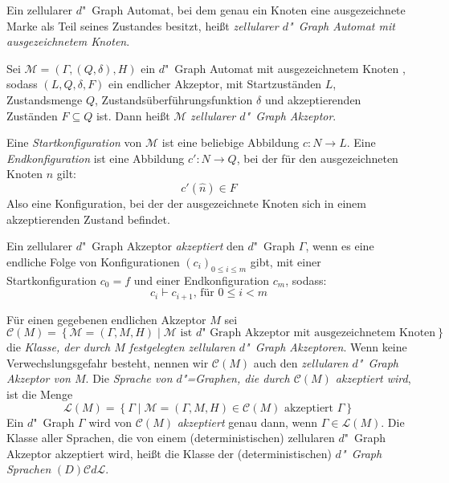 \documentclass[11pt]{article}
\newcommand{\defWord}[1]{\emph{#1}}
\begin{document}
\begin{definition}[Akzeptanz]
	Ein zellularer $d$"~Graph Automat, bei dem genau ein Knoten eine ausgezeichnete Marke als Teil seines Zustandes  besitzt, heißt \defWord{zellularer $d$"~Graph Automat mit ausgezeichnetem Knoten}.
	
	Sei $\mathcal{M} = \left(\Gamma, (Q, \delta), H \right)$ ein $d$"~Graph Automat mit ausgezeichnetem Knoten , sodass $(L, Q, \delta, F)$ ein endlicher Akzeptor, mit Startzuständen $L$, Zustandsmenge $Q$, Zustandsüberführungsfunktion $\delta$ und akzeptierenden Zuständen $F \subseteq Q$ ist. Dann heißt $\mathcal{M}$ \defWord{zellularer $d$"~Graph Akzeptor}.
	
	Eine \defWord{Startkonfiguration} von $\mathcal{M}$ ist eine beliebige Abbildung $c : N \rightarrow L$. 
	Eine \defWord{Endkonfiguration} ist eine Abbildung $c' : N \rightarrow Q$, bei der für den ausgezeichneten Knoten $\hat{n}$ gilt: 
	\begin{displaymath}
		c'(\hat{n}) \in F
	\end{displaymath} 
	Also eine Konfiguration, bei der der ausgezeichnete Knoten sich in einem akzeptierenden Zustand befindet.
	
	Ein zellularer $d$"~Graph Akzeptor \defWord{akzeptiert} den $d$"~Graph $\Gamma$, wenn es eine endliche Folge von Konfigurationen $\left(c_i\right)_{0 \le i \le m}$ gibt, mit einer Startkonfiguration $c_0 = f$ und einer Endkonfiguration $c_m$, sodass:
	\begin{displaymath}
		c_{i} \vdash c_{i+1} \text{, für } 0 \le i < m
	\end{displaymath}
\end{definition}

\begin{definition}[Sprachen]
	Für einen gegebenen endlichen Akzeptor $M$ sei 
	\begin{displaymath}
		\mathcal{C}(M) = \left\{\mathcal{M} = \left(\Gamma, M, H\right) \mid \mathcal{M} \text{ ist $d$"~Graph Akzeptor mit ausgezeichnetem Knoten} \right\}
	\end{displaymath} 
	die \defWord{Klasse, der durch $M$ festgelegten zellularen $d$"~Graph Akzeptoren}. 
	Wenn keine Verwechslungsgefahr besteht, nennen wir $\mathcal{C}(M)$ auch den \defWord{zellularen $d$"~Graph Akzeptor von $M$}.
	Die \defWord{Sprache von $d$"=Graphen, die durch $\mathcal{C}(M)$ akzeptiert wird}, ist die Menge 
	\begin{displaymath}
		\mathcal{L}(M) = \left\{\Gamma \mid \mathcal{M} = \left(\Gamma, M, H\right) \in \mathcal{C}(M) \text{ akzeptiert } \Gamma \right\}
	\end{displaymath}
	Ein $d$"~Graph $\Gamma$ wird von $\mathcal{C}(M)$ \defWord{akzeptiert} genau dann, wenn $\Gamma \in \mathcal{L}(M)$.
	Die Klasse aller Sprachen, die von einem (deterministischen) zellularen $d$"~Graph Akzeptor akzeptiert wird, heißt die Klasse der (deterministischen) \defWord{$d$"~Graph Sprachen} $(D)\mathcal{C}d\mathcal{L}$. 
\end{definition}
\end{document}
